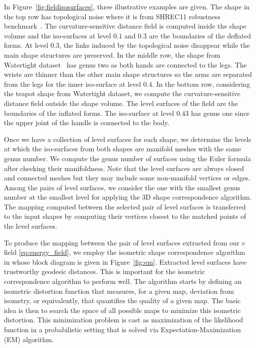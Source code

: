 In Figure~\ref{fig:fieldisosurfaces}, three illustrative examples are given.  The shape in the top row has topological noise where it is from SHREC11 robustness benchmark~\cite{bronstein2010shrec}. The curvature-sensitive distance field is computed inside the shape volume and the iso-surfaces at level $0.1$ and $0.3$ are the boundaries of the {deflated} forms.  At level $0.3$, the links induced by the topological noise disappear while the main shape structures are preserved. In the middle row, the shape from Watertight dataset~\cite{giorgi2007shrec} has genus two as both hands are connected to the legs. The wrists are thinner than the other main shape structures so the arms are separated from the legs for the inner iso-surface at level $0.4$. In the bottom row, considering the teapot shape from Watertight dataset, we compute the curvature-sensitive distance field outside the shape volume. The level surfaces of the field are the boundaries of the {inflated} forms. The iso-surface at level $0.43$ has genus one since the upper joint of the handle is connected to the body.


Once we have a collection of level surfaces for each shape, we determine the levels at which the iso-surfaces from both shapes are manifold meshes with the same genus number.  We compute the genus number of surfaces using the Euler formula after checking their manifoldness. Note that the level surfaces are always closed and connected meshes but they may include some non-manifold vertices or edges. Among the pairs of level surfaces, we consider the one with the smallest genus number at the smallest level for applying the 3D shape correspondence algorithm. The mapping computed between the selected pair of level surfaces  is transferred to the input shapes by computing their vertices closest to the matched points of the level surfaces.


{To produce the mapping between the pair of level surfaces extracted from our $v$ field \eqref{eq:energy_field}, we employ the isometric shape correspondence algorithm in \cite{ys2012EM} whose block diagram is given in Figure~\ref{fig:em}. Extracted  level surfaces have trustworthy geodesic distances. This is important for the isometric correspondence algorithm to perform well. The algorithm starts by defining an isometric distortion function that measures, for a given map, deviation from isometry, or equivalently, that quantifies the quality of a given map. The basic idea is then to search the space of all possible maps to minimize this isometric distortion. This minimization problem is cast as maximization of the likelihood function in a probabilistic setting that is solved via Expectation-Maximization (EM) algorithm.}

